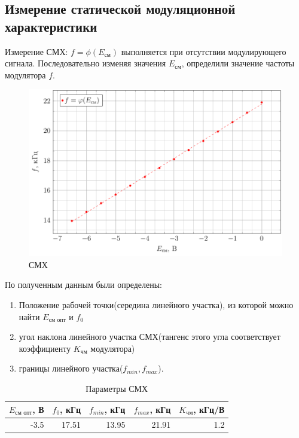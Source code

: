 \subsection{Измерение статической модуляционной характеристики}
Измерение СМХ: $f=\phi(E_\text{см})$ выполняется при отсутствии модулирующего сигнала. Последовательно изменяя значения $E_\text{см}$, определили значение частоты модулятора $f$.
\begin{figure}[!h]
	\centering
	\includegraphics[scale=1]{plots/task1.pdf}
	\caption{СМХ}
	\label{fig:figure1}
\end{figure}
По полученным данным были определены:
\begin{enumerate}
	\item {Положение рабочей точки(середина линейного участка), из которой можно найти $E_\text{см опт}$ и $f_0$}
	\item {угол наклона линейного участка СМХ(тангенс этого угла соответствует коэффициенту $K_\text{чм}$ модулятора)}
	\item {границы линейного участка($f_{min},f_{max}$).}
\end{enumerate}
\begin{table}[htbp]
  \centering
  \caption{Параметры СМХ}
    \begin{tabular}{|r|r|r|r|r|}
    \toprule
    \multicolumn{1}{|l|}{$E_\text{см опт}$, В} & \multicolumn{1}{l|}{$f_0$, кГц} & \multicolumn{1}{l|}{$f_{min}$, кГц} & \multicolumn{1}{l|}{$f_{max}$, кГц} & \multicolumn{1}{l|}{$K_\text{чм}$, кГц/В} \\
    \midrule
    -3.5  & 17.51 & 13.95 & 21.91 & 1.2 \\
    \bottomrule
    \end{tabular}%
  \label{tab:tab1}%
\end{table}%
